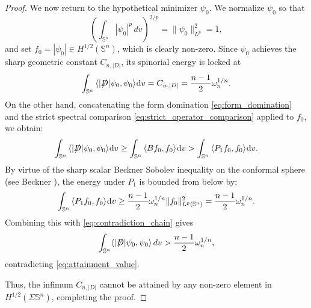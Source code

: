 \documentclass[a4paper, 12pt]{article}
\def\slashiii#1{\setbox0=\hbox{$#1$}#1\hskip-\wd0\hbox to\wd0{\hss\sl/\/\hss}}
\begin{document}
\begin{proof}
	
	We now return to the hypothetical minimizer $\psi_0$. We normalize \(\psi_0\) so that
	\[
	\left(\int_{\mathbb S^n}|\psi_0|^p\,dv\right)^{2/p}
	=\|\psi_0\|_{L^p}^2
	=1,
	\] 
	and set $f_0 = |\psi_0| \in H^{1/2}(\mathbb{S}^n)$, which is clearly non-zero. Since $\psi_0$ achieves the sharp geometric constant $C_{n,|D|}$, its spinorial energy is locked at
	\begin{equation}\label{eq:attainment_value}
		\int_{{\mathbb{S}^n}} {\left\langle {|\slashiii{D}|{\psi _0},{\psi _0}} \right\rangle } {\mkern 1mu} {\text{d}}v= C_{n,|D|} = \frac{n-1}{2}\omega_n^{1/n}.
	\end{equation}
	On the other hand, concatenating the form domination \eqref{eq:form_domination} and the strict spectral comparison \eqref{eq:strict_operator_comparison} applied to $f_0$, we obtain:
	\begin{equation}\label{eq:contradiction_chain}
		\int_{{\mathbb{S}^n}} {\left\langle {|\slashiii{D}|{\psi _0},{\psi _0}} \right\rangle } {\mkern 1mu} {\text{d}}v \geq \int_{{\mathbb{S}^n}} {\left\langle {B{f_0},{f_0}} \right\rangle } {\mkern 1mu} {\text{d}}v > \int_{{\mathbb{S}^n}} {\left\langle {{P_1}{f_0},{f_0}} \right\rangle } {\mkern 1mu} {\text{d}}v.
	\end{equation}
	By virtue of the sharp scalar Beckner Sobolev inequality on the conformal sphere (see Beckner \cite{MR1230930}), the energy under $P_1$ is bounded from below by:
	\[
	\int_{{\mathbb{S}^n}} {\left\langle {{P_1}{f_0},{f_0}} \right\rangle } {\mkern 1mu} {\text{d}}v \ge \frac{n-1}{2}\omega_n^{1/n} \|f_0\|_{L^{p}(\mathbb{S}^n)}^2 = \frac{n-1}{2}\omega_n^{1/n}.
	\]
	Combining this with \eqref{eq:contradiction_chain} gives
	\[
	\int_{\mathbb S^n}\langle |\slashiii{D}|\psi_0,\psi_0\rangle\,dv
	>
	\frac{n-1}{2}\omega_n^{1/n},
	\]
	contradicting \eqref{eq:attainment_value}.
	
	Thus, the infimum $C_{n,|D|}$ cannot be attained by any non-zero element in $H^{1/2}(\Sigma \mathbb{S}^n)$, completing the proof.
\end{proof}





\small


\end{document}
